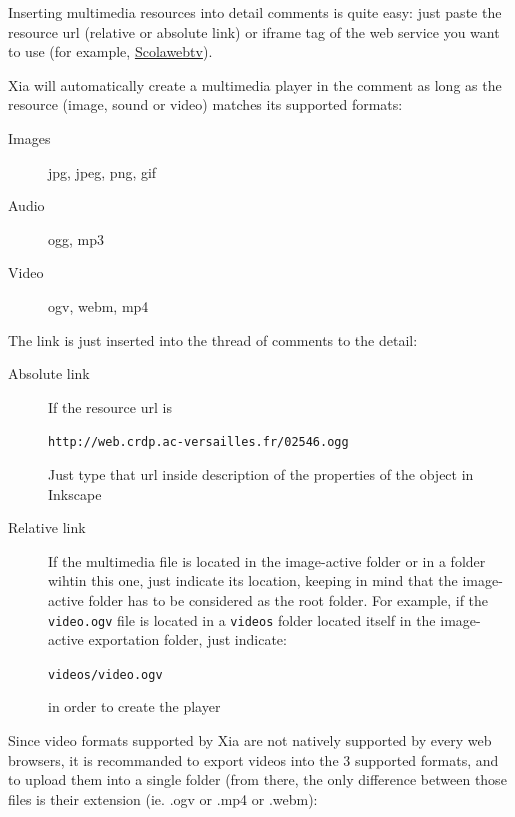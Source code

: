 Inserting multimedia resources into detail comments is quite easy: just paste 
the resource url (relative or absolute link) or iframe tag of the web service 
you want to use (for example, \href{https://scolawebtv.crdp-versailles.fr/}
{Scolawebtv}).

Xia will automatically create a multimedia player in the comment as long as 
the resource (image, sound or video) matches its supported formats: 
\begin{description}
 \item [Images] jpg, jpeg, png, gif
 \item [Audio] ogg, mp3
 \item [Video] ogv, webm, mp4
\end{description}

The link is just inserted into the thread of comments to the detail:
\begin{description}
 \item[Absolute link] If the resource url is\\
 \begin{center}
 \verb|http://web.crdp.ac-versailles.fr/02546.ogg|\\
 \end{center}
 Just type that url inside description of the properties of the object in 
 Inkscape
 \item [Relative link] If the multimedia file is located in the image-active 
 folder or in a folder wihtin this one, just indicate its location, keeping in 
 mind that the image-active folder has to be considered as the root folder. 
 For example, if the \verb|video.ogv| file is located in a \verb|videos| 
 folder located itself in the image-active exportation folder, just indicate:\\
 \begin{center}
  \verb|videos/video.ogv|
 \end{center}
  in order to create the player
\end{description}

Since video formats supported by Xia are not natively supported by every web 
browsers, it is recommanded to export videos into the 3 supported formats, 
and to upload them into a single folder (from there, the only difference 
between those files is their extension (ie. .ogv or .mp4 or .webm):\\

